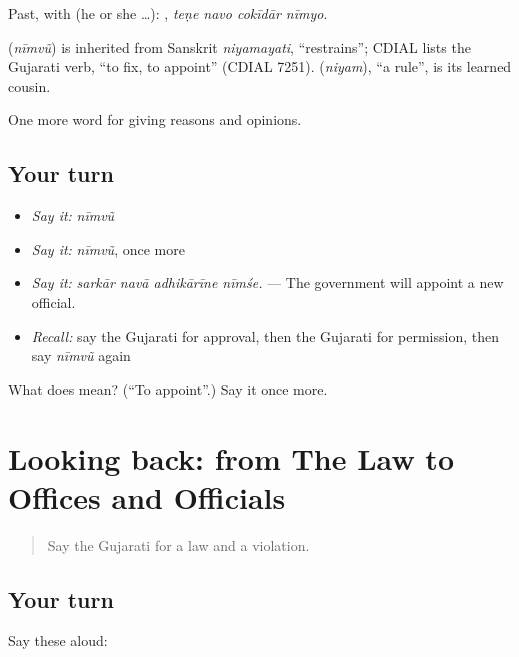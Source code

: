 Past, with  (he or she …):    , \emph{teṇe navo cokīdār nīmyo}.

\begin{cousinweb}
\textbf{} (\emph{nīmvũ}) is inherited from Sanskrit \emph{niyamayati}, \textquotedblleft{}restrains\textquotedblright{}; CDIAL lists the Gujarati verb, \textquotedblleft{}to fix, to appoint\textquotedblright{} (CDIAL 7251). \textbf{} (\emph{niyam}), \textquotedblleft{}a rule\textquotedblright{}, is its learned cousin.
\end{cousinweb}

\begin{grammarlens}[title={What you've built}]
One more word for giving reasons and opinions.
\end{grammarlens}

\subsection*{Your turn}
\begin{itemize}
\raggedright
  \item \emph{Say it:} \emph{nīmvũ}
  \item \emph{Say it:} \emph{nīmvũ}, once more
  \item \emph{Say it:} \emph{sarkār navā adhikārīne nīmśe.} — The government will appoint a new official.
  \item \emph{Recall:} say the Gujarati for approval, then the Gujarati for permission, then say \emph{nīmvũ} again
\end{itemize}

\begin{tcolorbox}[breakable,colback=teal!4,colframe=teal!35!black,title={Before you move on}]
What does  mean? (\textquotedblleft{}To appoint\textquotedblright{}.) Say it once more.
\end{tcolorbox}
\section[(dialogue)]{Looking back: from The Law to Offices and Officials}

\label{lesson:GU-R354-review-347-354}



\begin{quote}
Say the Gujarati for a law and a violation.
\end{quote}

\subsection*{Your turn}
Say these aloud:

